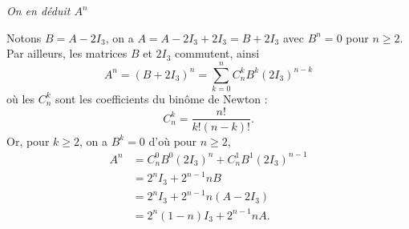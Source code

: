 {\begin{enumerate}
{{\it On en d\'eduit $A^n$}

Notons $B=A-2I_3$, on a $A=A-2I_3+2I_3=B+2I_3$ avec $B^n=0$ pour $n\geq2$. Par ailleurs, les matrices $B$ et $2I_3$ commutent, ainsi
$$A^n=(B+2I_3)^n=\sum^n_{k=0}C_n^kB^k(2I_3)^{n-k}$$
o\`u les $C_n^k$ sont les coefficients du bin\^ome de Newton :
$$C_n^k={\frac{n!}{k!(n-k)!}}.$$ 
Or, pour $k\geq2$, on a $B^k=0$ d'o\`u pour $n\geq2$,
\begin{align*}
A^n&=C_n^0B^0(2I_3)^n+C_n^1B^1(2I_3)^{n-1} \\ 
&=2^nI_3+2^{n-1}nB \\ 
&=2^nI_3+2^{n-1}n(A-2I_3) \\ 
&=2^n(1-n)I_3+2^{n-1}nA.
\end{align*}}
\end{enumerate}
}

